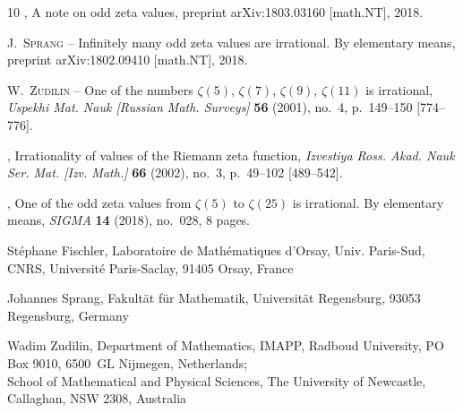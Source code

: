 \documentclass{article}
\numberwithin{equation}{section}
\theoremstyle{remark}
\begin{document}
\begin{thebibliography}{10}
\bysame , {\og A note on odd zeta values\fg}, preprint arXiv:1803.03160
  [math.NT], 2018.

{\scshape J.~Sprang} -- {\og Infinitely many odd zeta values are irrational.
  {B}y elementary means\fg}, preprint arXiv:1802.09410 [math.NT], 2018.

{\scshape W.~Zudilin} -- {\og One of the numbers $\zeta(5)$, $\zeta(7)$,
  $\zeta(9)$, $\zeta(11)$ is irrational\fg}, \emph{Uspekhi Mat. Nauk [Russian
  Math. Surveys]} \textbf{56} (2001), no.~4, p.~149--150 [774--776].

\bysame , {\og Irrationality of values of the {R}iemann zeta function\fg},
  \emph{Izvestiya Ross. Akad. Nauk Ser. Mat. [Izv. Math.]} \textbf{66} (2002),
  no.~3, p.~49--102 [489--542].

\bysame , {\og One of the odd zeta values from $\zeta(5)$ to $\zeta(25)$ is
  irrational. {B}y elementary means\fg}, \emph{SIGMA} \textbf{14} (2018),
  no.~028, 8 pages.

\end{thebibliography}


\bigskip
\noindent
St\'ephane Fischler,
Laboratoire de Math\'ematiques d'Orsay, Univ. Paris-Sud, CNRS, Universit\'e Paris-Saclay, 91405 Orsay, France

\bigskip
\noindent
Johannes Sprang,
Fakult\"at f\"ur Mathematik, Universit\"at Regensburg, 93053 Regensburg, Germany

\bigskip
\noindent
Wadim Zudilin,
Department of Mathematics, IMAPP, Radboud University, PO Box 9010, 6500~GL Nijmegen, Netherlands; \\
School of Mathematical and Physical Sciences, The University of Newcastle, Callaghan, NSW 2308, Australia
\end{document}

